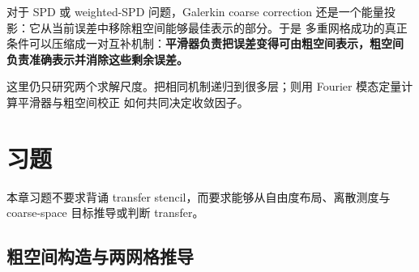 对于 SPD 或 weighted-SPD 问题，Galerkin coarse correction 还是一个能量投影：它从当前误差中移除粗空间能够最佳表示的部分。于是 多重网格成功的真正条件可以压缩成一对互补机制：\textbf{平滑器负责把误差变得可由粗空间表示，粗空间 负责准确表示并消除这些剩余误差。}

这里仍只研究两个求解尺度。把相同机制递归到很多层；则用 Fourier 模态定量计算平滑器与粗空间校正 如何共同决定收敛因子。

\section*{习题}

本章习题不要求背诵 transfer stencil，而要求能够从自由度布局、离散测度与 coarse-space 目标推导或判断 transfer。

\subsection*{粗空间构造与两网格推导}
